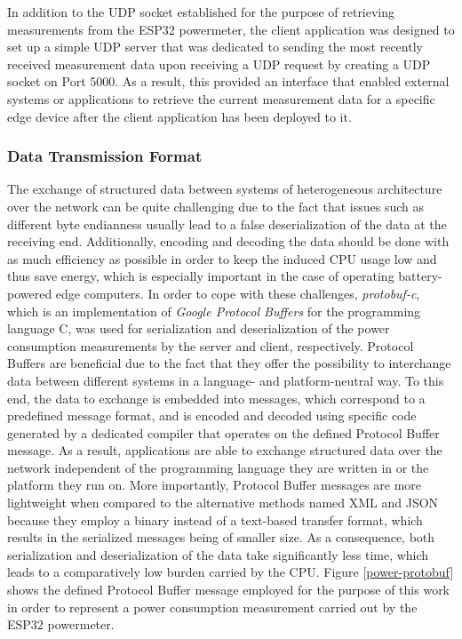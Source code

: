 In addition to the UDP socket established for the purpose of retrieving measurements from the ESP32 powermeter, the client application was designed to set up a simple UDP server that was dedicated to sending the most recently received measurement data upon receiving a UDP request by creating a UDP socket on Port 5000. As a result, this provided an interface that enabled external systems or applications to retrieve the current measurement data for a specific edge device after the client application has been deployed to it.

\subsubsection{Data Transmission Format}
The exchange of structured data between systems of heterogeneous architecture over the network can be quite challenging due to the fact that issues such as different byte endianness usually lead to a false deserialization of the data at the receiving end. Additionally, encoding and decoding the data should be done with as much efficiency as possible in order to keep the induced CPU usage low and thus save energy, which is especially important in the case of operating battery-powered edge computers. In order to cope with these challenges, \textit{protobuf-c}, which is an implementation of \textit{Google Protocol Buffers} for the programming language C, was used for serialization and deserialization of the power consumption measurements by the server and client, respectively. Protocol Buffers are beneficial due to the fact that they offer the possibility to interchange data between different systems in a language- and platform-neutral way. To this end, the data to exchange is embedded into messages, which correspond to a predefined message format, and is encoded and decoded using specific code generated by a dedicated compiler that operates on the defined Protocol Buffer message. As a result, applications are able to exchange structured data over the network independent of the programming language they are written in or the platform they run on. More importantly, Protocol Buffer messages are more lightweight when compared to the alternative methods named XML and JSON~\parencite{protobuffers} because they employ a binary instead of a text-based transfer format, which results in the serialized messages being of smaller size. As a consequence, both serialization and deserialization of the data take significantly less time, which leads to a comparatively low burden carried by the CPU. Figure \ref{power-protobuf} shows the defined Protocol Buffer message employed for the purpose of this work in order to represent a power consumption measurement carried out by the ESP32 powermeter.


